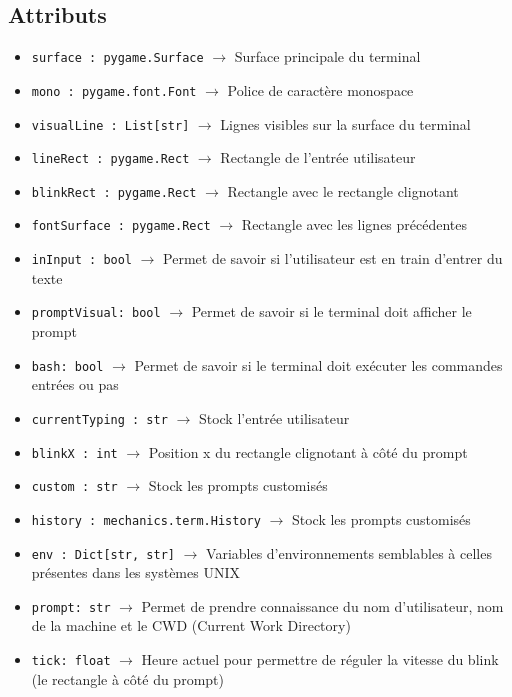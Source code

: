 \documentclass{report}
\begin{document}
\subsection*{Attributs}

\begin{itemize}
  \item \texttt{surface : pygame.Surface}		$\rightarrow$ Surface principale du terminal
  \item \texttt{mono : pygame.font.Font}		$\rightarrow$ Police de caractère monospace
  \item \texttt{visualLine : List[str]}		$\rightarrow$ Lignes visibles sur la surface du terminal
  \item \texttt{lineRect : pygame.Rect}		$\rightarrow$ Rectangle de l’entrée utilisateur
  \item \texttt{blinkRect : pygame.Rect}		$\rightarrow$ Rectangle avec le rectangle clignotant
  \item \texttt{fontSurface : pygame.Rect}		$\rightarrow$ Rectangle avec les lignes précédentes
  \item \texttt{inInput : bool}			$\rightarrow$ Permet de savoir si l’utilisateur est en train d'entrer du texte
  \item \texttt{promptVisual: bool}			$\rightarrow$ Permet de savoir si le terminal doit afficher le prompt
  \item \texttt{bash: bool}				$\rightarrow$ Permet de savoir si le terminal doit exécuter les commandes entrées ou pas
  \item \texttt{currentTyping : str}		$\rightarrow$ Stock l’entrée utilisateur
  \item \texttt{blinkX : int}			$\rightarrow$ Position x du rectangle clignotant à côté du prompt
  \item \texttt{custom : str}			$\rightarrow$ Stock les prompts customisés
  \item \texttt{history : mechanics.term.History}	$\rightarrow$ Stock les prompts customisés
  \item \texttt{env : Dict[str, str]}		$\rightarrow$ Variables d'environnements semblables à celles présentes dans les systèmes UNIX
  \item \texttt{prompt: str}		$\rightarrow$ Permet de prendre connaissance du nom d’utilisateur, nom de la machine et le CWD (Current Work Directory)
  \item \texttt{tick: float}		$\rightarrow$ Heure actuel pour permettre de réguler la vitesse du blink (le rectangle à côté du prompt)

\end{itemize}
\end{document}
